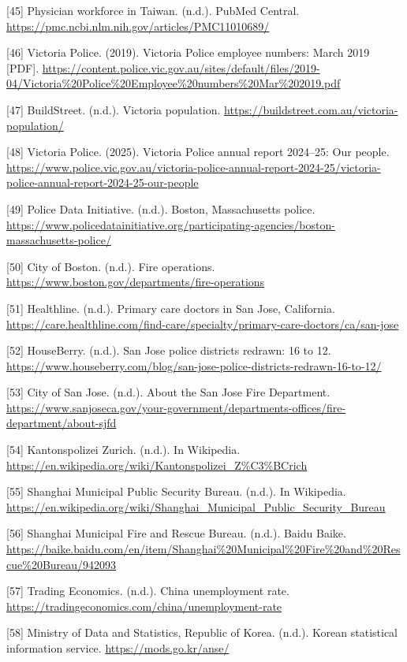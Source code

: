 \documentclass[11pt,letterpaper]{article}
\begin{document}
[45] Physician workforce in Taiwan. (n.d.). PubMed Central. \url{https://pmc.ncbi.nlm.nih.gov/articles/PMC11010689/}


[46] Victoria Police. (2019). Victoria Police employee numbers: March 2019 [PDF]. \url{https://content.police.vic.gov.au/sites/default/files/2019-04/Victoria\%20Police\%20Employee\%20numbers\%20Mar\%202019.pdf}


[47] BuildStreet. (n.d.). Victoria population. \url{https://buildstreet.com.au/victoria-population/}


[48] Victoria Police. (2025). Victoria Police annual report 2024--25: Our people. \url{https://www.police.vic.gov.au/victoria-police-annual-report-2024-25/victoria-police-annual-report-2024-25-our-people}


[49] Police Data Initiative. (n.d.). Boston, Massachusetts police. \url{https://www.policedatainitiative.org/participating-agencies/boston-massachusetts-police/}


[50] City of Boston. (n.d.). Fire operations. \url{https://www.boston.gov/departments/fire-operations}


[51] Healthline. (n.d.). Primary care doctors in San Jose, California. \url{https://care.healthline.com/find-care/specialty/primary-care-doctors/ca/san-jose}


[52] HouseBerry. (n.d.). San Jose police districts redrawn: 16 to 12. \url{https://www.houseberry.com/blog/san-jose-police-districts-redrawn-16-to-12/}


[53] City of San Jose. (n.d.). About the San Jose Fire Department. \url{https://www.sanjoseca.gov/your-government/departments-offices/fire-department/about-sjfd}


[54] Kantonspolizei Zurich. (n.d.). In Wikipedia. \url{https://en.wikipedia.org/wiki/Kantonspolizei_Z\%C3\%BCrich}


[55] Shanghai Municipal Public Security Bureau. (n.d.). In Wikipedia. \url{https://en.wikipedia.org/wiki/Shanghai_Municipal_Public_Security_Bureau}


[56] Shanghai Municipal Fire and Rescue Bureau. (n.d.). Baidu Baike. \url{https://baike.baidu.com/en/item/Shanghai\%20Municipal\%20Fire\%20and\%20Rescue\%20Bureau/942093}


[57] Trading Economics. (n.d.). China unemployment rate. \url{https://tradingeconomics.com/china/unemployment-rate}


[58] Ministry of Data and Statistics, Republic of Korea. (n.d.). Korean statistical information 
service. \url{https://mods.go.kr/anse/}
\end{document}
